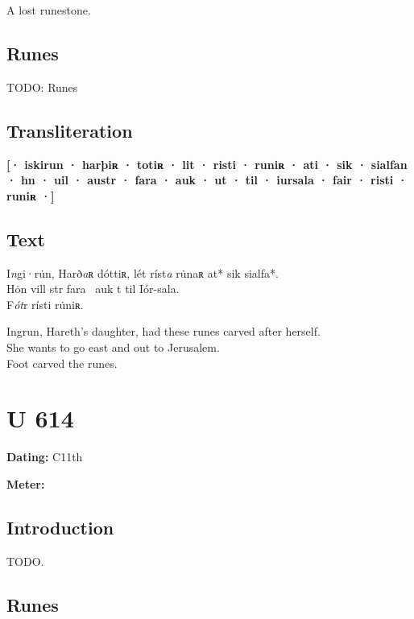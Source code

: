 A lost runestone.

\subsection{Runes}

TODO: Runes%

\subsection{Transliteration}

\textbf{[· iskirun · harþiʀ · totiʀ · lit · risti · runiʀ · ati · sik · sialfan · hn · uil · austr · fara · auk · ut · til · iursala · fair · risti · runiʀ ·]}

\subsection{Text}

\bpg\bpa[0]%
\startsub I\emph{n}gi·ru̇n, Harð\emph{a}ʀ dóttiʀ, lét ríst\emph{a} ru̇naʀ at* sik sialfa*.\endsub \\
Hȯn vill str fara \hld\ auk t til Iór-sala. \\
F\emph{ót}r rísti ru̇niʀ.\epa

\bpb Ingrun, Hareth’s daughter, had these runes carved after herself. \\
She wants to go east and out to Jerusalem. \\
Foot carved the runes.\epb\epg

\sectionline\clearpage


\section{U 614}

\begin{flushright}%
\textbf{Dating:} C11th

\textbf{Meter:} \Fornyrdislag
\end{flushright}%

\subsection{Introduction}

TODO.

\subsection{Runes}

